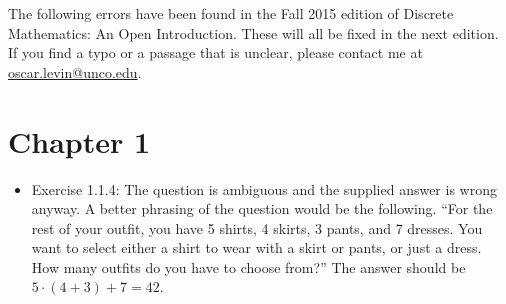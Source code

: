 \documentclass{article}
\begin{document}
The following errors have been found in the Fall 2015 edition of Discrete Mathematics: An Open Introduction.  These will all be fixed in the next edition.  If you find a typo or a passage that is unclear, please contact me at \url{oscar.levin@unco.edu}.  


\section*{Chapter 1}

\begin{itemize}
\item Exercise 1.1.4: The question is ambiguous and the supplied answer is wrong anyway.  A better phrasing of the question would be the following. ``For the rest of your outfit, you have 5 shirts, 4 skirts, 3 pants, and 7 dresses.  You want to select either a shirt to wear with a skirt or pants, or just a  dress.  How many outfits do you have to choose from?''  The answer should be $5\cdot (4+3) + 7 = 42$.
\end{itemize}
\end{document}
